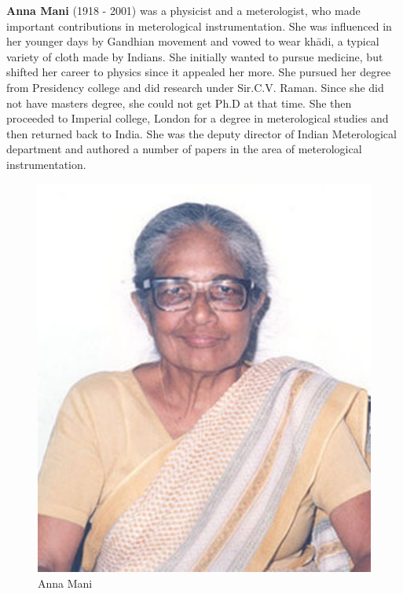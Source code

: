 \documentclass[a4paper,10pt]{article}
\begin{document}
\newblock
\textbf{Anna Mani} (1918 - 2001) was a physicist and a meterologist, who made important contributions in meterological instrumentation. She was influenced in her younger days by Gandhian movement and vowed to wear kh\={a}di, a typical variety of cloth made by Indians. She initially wanted to pursue medicine, but shifted her career to physics since it appealed her more. She pursued her degree from Presidency college and did research under Sir.C.V. Raman. Since she did not have masters degree, she could not get Ph.D at that time. She then proceeded to Imperial college, London for a degree in meterological studies and then returned back to India. She was the deputy director of Indian Meterological department and authored a number of papers in the area of meterological instrumentation. \cite{anna}

\begin{center}
\begin{figure}[h]
\centering
 \includegraphics[scale=1.0]{anna.jpg}
 \caption{Anna Mani}
\end{figure}
\end{center}
\end{document}
